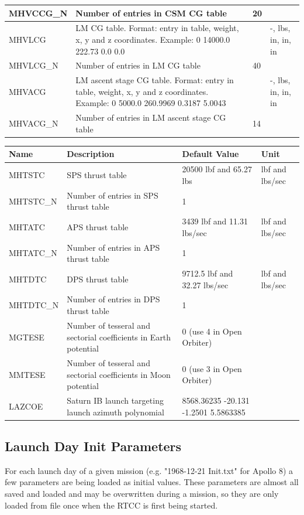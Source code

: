 \documentclass[11pt]{article} %
\begin{document}
\begin{tabular}{L{3cm} L{7cm} L{2.5cm} L{1.5cm}}
\hline
MHVCCG\_N&Number of entries in CSM CG table&20&\\
\hline
MHVLCG&LM CG table. Format: entry in table, weight, x, y and z coordinates. Example: 0 14000.0 222.73 0.0 0.0&&-, lbs, in, in, in\\
\hline
MHVLCG\_N&Number of entries in LM CG table&40&\\
\hline
MHVACG&LM ascent stage CG table. Format: entry in table, weight, x, y and z coordinates. Example: 0 5000.0 260.9969 0.3187 5.0043&&-, lbs, in, in, in\\
\hline
MHVACG\_N&Number of entries in LM ascent stage CG table&14&\\
\hline
\end{tabular}

\newpage
\begin{tabular}{L{3cm} L{7cm} L{2.5cm} L{1.5cm}}
\hline
\textbf{Name} & \textbf{Description} & \textbf{Default Value} & \textbf{Unit}\\
\hline
MHTSTC&SPS thrust table&20500 lbf and 65.27 lbs &lbf and lbs/sec\\
\hline
MHTSTC\_N&Number of entries in SPS thrust table&1&\\
\hline
MHTATC&APS thrust table&3439 lbf and 11.31 lbs/sec&lbf and lbs/sec\\
\hline
MHTATC\_N&Number of entries in APS thrust table&1&\\
\hline
MHTDTC&DPS thrust table&9712.5 lbf and 32.27 lbs/sec&lbf and lbs/sec\\
\hline
MHTDTC\_N&Number of entries in DPS thrust table&1&\\
\hline
MGTESE&Number of tesseral and sectorial coefficients in Earth potential&0 (use 4 in Open Orbiter)&\\
\hline
MMTESE&Number of tesseral and sectorial coefficients in Moon potential&0 (use 3 in Open Orbiter)&\\
\hline
LAZCOE&Saturn IB launch targeting launch azimuth polynomial& 8568.36235 -20.131 -1.2501 5.5863385&\\
\hline
\end{tabular}
\newpage
\subsection{Launch Day Init Parameters}

For each launch day of a given mission (e.g. "1968-12-21 Init.txt" for Apollo 8) a few parameters are being loaded as initial values. These parameters are almost all saved and loaded and may be overwritten during a mission, so they are only loaded from file once when the RTCC is first being started.\\
\end{document}
